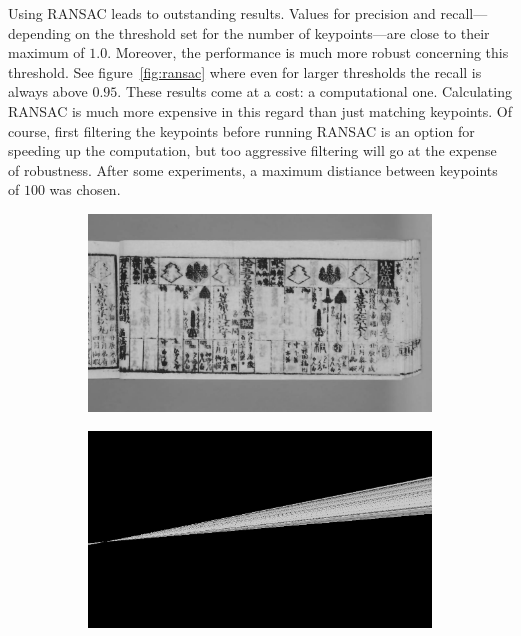 \documentclass{ltjarticle}
\begin{document}
Using RANSAC leads to outstanding results. Values for precision and recall---depending on the threshold set for the number of keypoints---are close to their maximum of $1.0$. Moreover, the performance is much more robust concerning this threshold. See figure~\ref{fig:ransac} where even for larger thresholds the recall is always above $0.95$. These results come at a cost: a computational one. Calculating RANSAC is much more expensive in this regard than just matching keypoints. Of course, first filtering the keypoints before running RANSAC is an option for speeding up the computation, but too aggressive filtering will go at the expense of robustness. After some experiments, a maximum distiance between keypoints of $100$ was chosen.

\begin{figure}
    \centering
    \begin{subfigure}{.49\textwidth}
        \includegraphics[width=\textwidth]{homography-good.jpg}
        \caption{}
    \end{subfigure}
    \begin{subfigure}{.49\textwidth}
        \includegraphics[width=\textwidth]{homography-bad.png}

\end{subfigure}
\end{figure}
\end{document}
